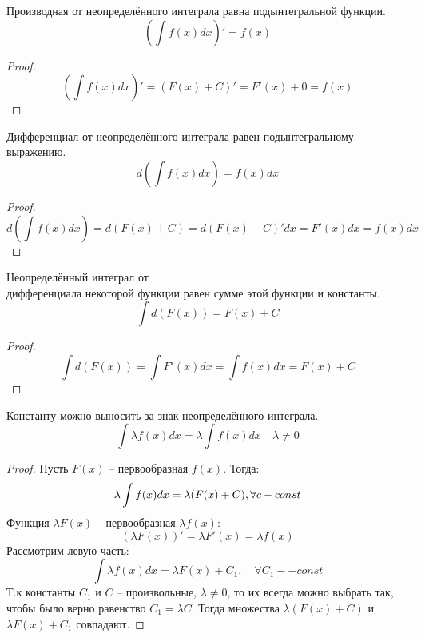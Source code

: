 \begin{property}[1]
    Производная от неопределённого интеграла равна подынтегральной функции. \[
        \left(\int f(x)dx \right)' = f(x)
    \] 
\end{property}
\begin{proof}
    \[
        \left(\int f(x) dx \right)' = (F(x) + C)' = F'(x) + 0 = f(x)
    \]
\end{proof}

\begin{property}[2]
   Дифференциал от неопределённого интеграла равен подынтегральному выражению. \[
        d \left(\int f(x) dx \right) = f(x) dx
    \]
\end{property}

\begin{proof}
    \[
        d \left(\int f(x) dx \right) = d (F(x) + C) = d(F(x) + C)'dx = F'(x)dx = f(x) dx
    \]
\end{proof}

\begin{property}[3]
    Неопределённый интеграл от \\ дифференциала некоторой функции равен сумме этой функции и константы. \[
        \int d(F(x)) = F(x) + C
    \]
\end{property}
\begin{proof}
    \[
        \int d(F(x)) = \int F'(x) dx = \int f(x) dx = F(x) + C
    \]
\end{proof}

\begin{property}[4]
    Константу можно выносить за знак неопределённого интеграла. \[
        \int \lambda f(x) dx = \lambda \int f(x) dx \quad \lambda \neq 0
    \]
\end{property}
\begin{proof}
    Пусть $F(x)$ -- первообразная $f(x)$. Тогда: \[
        \lambda \int f(x) dx = \lambda (F(x) + C), \forall c - const \\
    \]
    Функция $\lambda F(x)$ -- первообразная $\lambda f(x)$: \[
        \left(\lambda F(x)\right)' = \lambda F'(x) = \lambda f(x)
    \]
    Рассмотрим левую часть: \[
        \int \lambda f(x) dx = \lambda F(x) + C_1, \quad \forall C_1 -- const
    \]
    Т.к константы $C_1$ и $C$ -- произвольные, $\lambda \neq 0$, то их всегда можно выбрать так, чтобы было верно равенство $C_1 = \lambda C$. Тогда множества $\lambda (F(x) + C)$ и $\lambda F(x) + C_1$ совпадают.
\end{proof}

